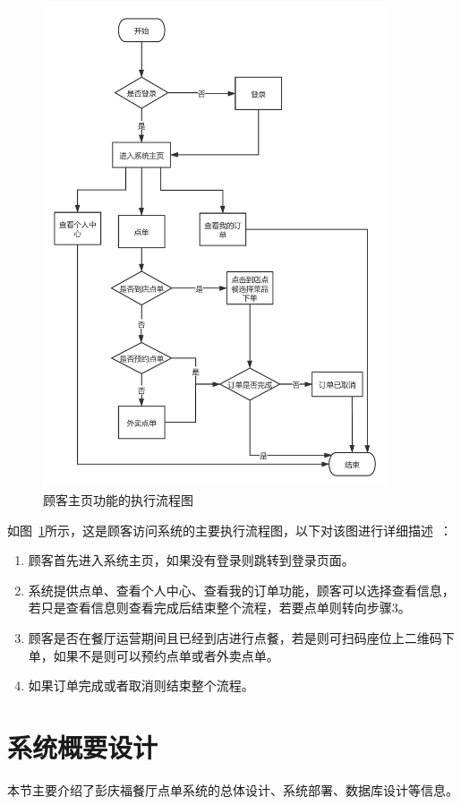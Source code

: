 \begin{figure}[htbp!]
  \centering
  \includegraphics[width=4in]{FIGs/chapter3/flow.pdf}
  \caption{顾客主页功能的执行流程图}\label{fig_flowCH3}
\end{figure}

如图~\ref{fig_flowCH3}所示，这是顾客访问系统的主要执行流程图，以下对该图进行详细描述~\cite{liu2014design}：
\begin{enumerate}
  \item 顾客首先进入系统主页，如果没有登录则跳转到登录页面。
  \item 系统提供点单、查看个人中心、查看我的订单功能，顾客可以选择查看信息，若只是查看信息则查看完成后结束整个流程，若要点单则转向步骤3。
  \item 顾客是否在餐厅运营期间且已经到店进行点餐，若是则可扫码座位上二维码下单，如果不是则可以预约点单或者外卖点单。
  \item 如果订单完成或者取消则结束整个流程。
\end{enumerate}

\section{系统概要设计}
本节主要介绍了彭庆福餐厅点单系统的总体设计、系统部署、数据库设计等信息。\\
